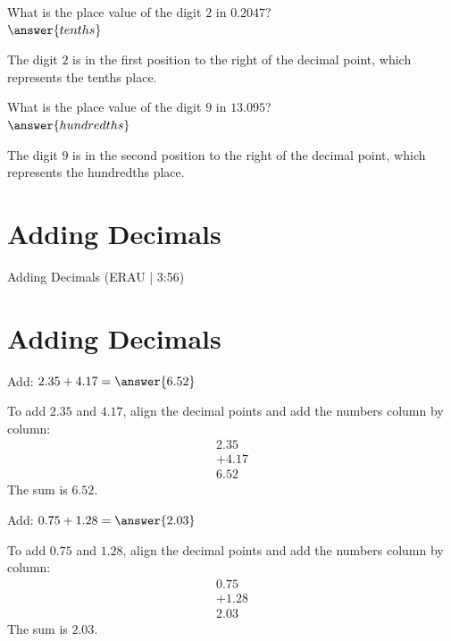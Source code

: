 \documentclass{ximera}
\begin{document}
\begin{problem}
What is the place value of the digit $2$ in $0.2047$?\\
$\answer{tenths}$
\begin{feedback}
The digit $2$ is in the first position to the right of the decimal point, which represents the tenths place.
\end{feedback}
\end{problem}

\begin{problem}
What is the place value of the digit $9$ in $13.095$?\\
$\answer{hundredths}$
\begin{feedback}
The digit $9$ is in the second position to the right of the decimal point, which represents the hundredths place.
\end{feedback}
\end{problem}

\section*{Adding Decimals}

Adding Decimals (ERAU | 3:56)



\section*{Adding Decimals}

\begin{problem}
Add: $2.35 + 4.17 = \answer{6.52}$
\begin{feedback}
To add $2.35$ and $4.17$, align the decimal points and add the numbers column by column:
\begin{align*}
  2.35 \\
+ 4.17 \\
\hline
  6.52
\end{align*}
The sum is $6.52$.
\end{feedback}
\end{problem}

\begin{problem}
Add: $0.75 + 1.28 = \answer{2.03}$
\begin{feedback}
To add $0.75$ and $1.28$, align the decimal points and add the numbers column by column:
\begin{align*}
  0.75 \\
+ 1.28 \\
\hline
  2.03
\end{align*}
The sum is $2.03$.
\end{feedback}
\end{problem}
\end{document}
